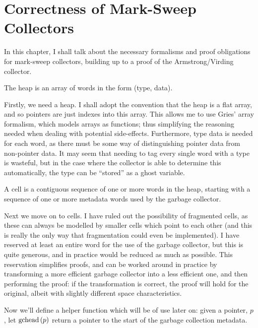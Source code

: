 \chapter{Correctness of Mark-Sweep Collectors}
\label{sec:marksweep}

In this chapter, I shall talk about the necessary formalisms and proof
obligations for mark-sweep collectors, building up to a
proof of the Armstrong/Virding\cite{Armstrong95} collector.

\begin{definition}[Heap]
  \label{def:ms-heap}
  The heap is an array of words in the form (type, data).
\end{definition}

Firstly, we need a heap. I shall adopt the convention that the heap is
a flat array, and so pointers are just indexes into this array. This
allows me to use Gries' array formalism\cite{Gries87}, which models
arrays as functions; thus simplifying the reasoning needed when
dealing with potential side-effects. Furthermore, type data is needed
for each word, as there must be some way of distinguishing pointer
data from non-pointer data. It may seem that needing to tag every
single word with a type is wasteful, but in the case where the
collector is able to determine this automatically, the type can be
``stored'' as a ghost variable.

\begin{definition}[Cell]
  \label{def:ms-cell}
  A cell is a contiguous sequence of one or more words in the heap,
  starting with a sequence of one or more metadata words used by the
  garbage collector.
\end{definition}

Next we move on to cells. I have ruled out the possibility of
fragmented cells, as these can always be modelled by smaller cells
which point to each other (and this is really the only way that
fragmentation could even be implemented). I have reserved at least an
entire word for the use of the garbage collector, but this is quite
generous, and in practice would be reduced as much as possible. This
reservation simplifies proofs, and can be worked around in practice by
transforming a more efficient garbage collector into a less efficient
one, and then performing the proof: if the transformation is correct,
the proof will hold for the original, albeit with slightly different
space characteristics.

Now we'll define a helper function which will be of use later on:
given a pointer, $p$, let $\mathrm{gchead}\left(p\right)$ return a pointer to the start
of the garbage collection metadata.

